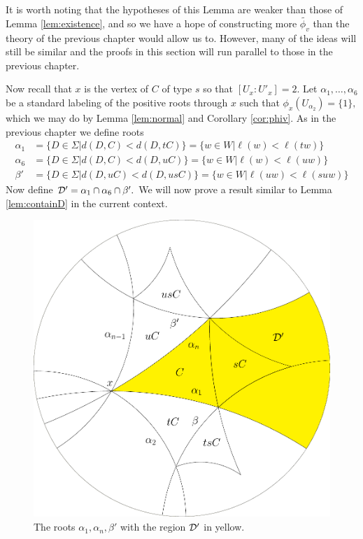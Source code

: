 \documentclass[class=book, crop=false]{standalone}
\begin{document}
It is worth noting that the hypotheses of this Lemma are weaker than those of Lemma \ref{lem:existence}, and so we have a hope of constructing more $\tilde{\phi_v}$ than the theory of the previous chapter would allow us to. However, many of the ideas will still be similar and the proofs in this section will run parallel to those in the previous chapter.

Now recall that $x$ is the vertex of $C$ of type $s$ so that $[U_x:U'_x]=2.$ Let $\alpha_1,\dots,\alpha_6$ be a standard labeling of the positive roots through $x$ such that $\phi_x(U_{\alpha_2})=\{1\},$ which we may do by Lemma \ref{lem:normal} and Corollary \ref{cor:phiv}. As in the previous chapter we define roots
	\begin{align*}
		\alpha_1&=\{D\in \Sigma|d(D,C)<d(D,tC)\}=\{w\in W|\ell(w)<\ell(tw)\}\\
		\alpha_6&=\{D\in \Sigma|d(D,C)<d(D,uC)\}=\{w\in W|\ell(w)<\ell(uw)\}\\
		\beta'&=\{D\in \Sigma|d(D,uC)<d(D,usC)\}=\{w\in W|\ell(uw)<\ell(suw)\}
	\end{align*}
	Now define $\mathcal{D}'=\alpha_1\cap \alpha_6\cap \beta'.$ We will now prove a result similar to Lemma \ref{lem:containD} in the current context.


	\begin{figure}
		\begin{center}
			\includegraphics[width=3.5 in]{diagrams/defineDprime.pdf}
		\end{center}
		\caption{The roots $\alpha_1,\alpha_n,\beta'$ with the region $\mathcal{D}'$ in yellow.}
		\label{fig:defineDprime}
	\end{figure}
\end{document}
